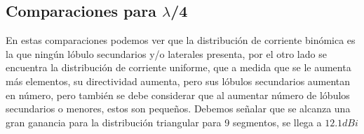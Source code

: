 \documentclass[11pt]{report}
\begin{document}
\newpage

\subsection{Comparaciones para $\lambda$/4}

En estas comparaciones podemos ver que la distribución de corriente binómica es la que ningún lóbulo secundarios y/o laterales presenta, por el otro lado se encuentra la distribución de corriente uniforme, que a medida que se le aumenta más elementos, su directividad aumenta, pero sus lóbulos secundarios aumentan en número, pero también se debe considerar que al aumentar número de lóbulos secundarios o menores, estos son pequeños. Debemos señalar que se alcanza una gran ganancia para la distribución triangular para 9 segmentos, se llega a $12.1dBi$ 
\end{document}
